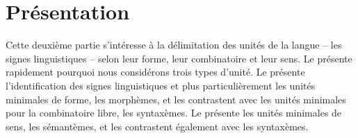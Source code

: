 \section*{Présentation}

Cette deuxième partie s’intéresse à la délimitation des unités de la langue – les signes linguistiques – selon leur forme, leur combinatoire et leur sens. Le  présente rapidement pourquoi nous considérons trois types d’unité. Le  présente l’identification des signes linguistiques et plus particulièrement les unités minimales de forme, les morphèmes, et les contrastent avec les unités minimales pour la combinatoire libre, les syntaxèmes. Le  présente les unités minimales de sens, les sémantèmes, et les contrastent également avec les syntaxèmes.
